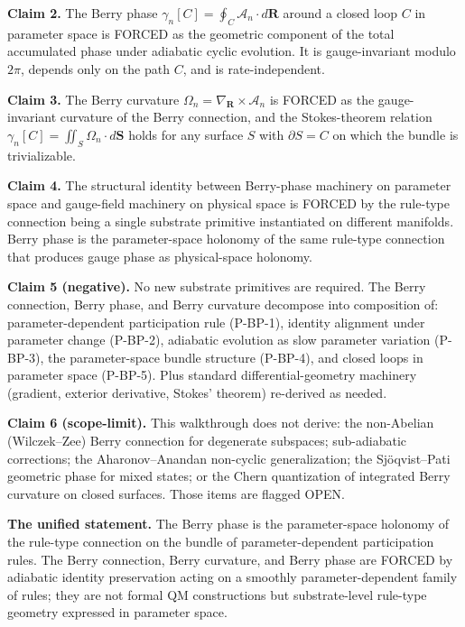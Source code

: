 \documentclass[11pt,a4paper]{article}
\begin{document}
\textbf{Claim 2.} The Berry phase $\gamma_n[C] = \oint_C \mathcal{A}_n\cdot d\mathbf{R}$ around a closed loop $C$ in parameter space is FORCED as the geometric component of the total accumulated phase under adiabatic cyclic evolution. It is gauge-invariant modulo $2\pi$, depends only on the path $C$, and is rate-independent.

\textbf{Claim 3.} The Berry curvature $\Omega_n = \nabla_\mathbf{R}\times\mathcal{A}_n$ is FORCED as the gauge-invariant curvature of the Berry connection, and the Stokes-theorem relation $\gamma_n[C] = \iint_S \Omega_n\cdot d\mathbf{S}$ holds for any surface $S$ with $\partial S = C$ on which the bundle is trivializable.

\textbf{Claim 4.} The structural identity between Berry-phase machinery on parameter space and gauge-field machinery on physical space is FORCED by the rule-type connection being a single substrate primitive instantiated on different manifolds. Berry phase is the parameter-space holonomy of the same rule-type connection that produces gauge phase as physical-space holonomy.

\textbf{Claim 5 (negative).} No new substrate primitives are required. The Berry connection, Berry phase, and Berry curvature decompose into composition of: parameter-dependent participation rule (P-BP-1), identity alignment under parameter change (P-BP-2), adiabatic evolution as slow parameter variation (P-BP-3), the parameter-space bundle structure (P-BP-4), and closed loops in parameter space (P-BP-5). Plus standard differential-geometry machinery (gradient, exterior derivative, Stokes' theorem) re-derived as needed.

\textbf{Claim 6 (scope-limit).} This walkthrough does not derive: the non-Abelian (Wilczek--Zee) Berry connection for degenerate subspaces; sub-adiabatic corrections; the Aharonov--Anandan non-cyclic generalization; the Sj\"oqvist--Pati geometric phase for mixed states; or the Chern quantization of integrated Berry curvature on closed surfaces. Those items are flagged OPEN.

\textbf{The unified statement.} The Berry phase is the parameter-space holonomy of the rule-type connection on the bundle of parameter-dependent participation rules. The Berry connection, Berry curvature, and Berry phase are FORCED by adiabatic identity preservation acting on a smoothly parameter-dependent family of rules; they are not formal QM constructions but substrate-level rule-type geometry expressed in parameter space.
\end{document}
